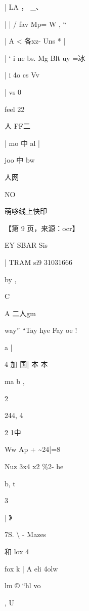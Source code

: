 \documentclass[UTF8,12pt,a4paper,openany]{ctexbook}
\begin{document}
\begin{enumerate}[label=\textbf{\arabic*.},leftmargin=2em]
|     LA     ，        \_、\par | |     /    fav       Mp= W  , “\par |      A <           各xz- Uns *             |\par |  ‘           i ne  bs. Mg Blt uy =冰\par | i        4o            cs  Vv\par |      vs       0\par feel 22\par 人                         FF二\par |     mo                     中     al |\par joo 中                bw\par 人网\par NO\par 萌哆线上快印\par \par 【第 9 页，来源：ocr】\par EY SBAR Sis\par |        TRAM si9 31031666\par by                                          ,\par C\par A             二人gm\par way”                 “Tay    hye Fay oe                                   !\par a                                                                      |\par 4         加                        国| 本 本\par *\par ma                 b                                                          ,\par 2\par 244,             4\par 2 1中\par Ww      Ap + \textasciitilde{}24|=8\par Nuz 3x4 x2 \%2- he\par b,                     t\par 3\par |                 》\par 7S. \textbackslash{}     -                                 Mazes\par 和          lox 4\par fox k    |                    A eli            4olw\par lm     © “hl                    vo\par ,        U                    
\end{enumerate}
\end{document}
